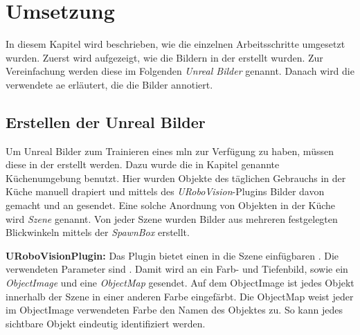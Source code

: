 \graphicspath{{./images/}}      
\def\CHAPTERONE{./chapters/Chapter-1} 

\chapter{Umsetzung}
\label{chap:implementation}
%	

In diesem Kapitel wird beschrieben, wie die einzelnen Arbeitsschritte umgesetzt wurden. Zuerst wird aufgezeigt, wie die Bildern in der \unreal erstellt wurden. Zur Vereinfachung werden diese  im Folgenden \textit{Unreal Bilder} genannt. Danach wird die verwendete \gls{ae} erläutert, die die Bilder annotiert. 

\section{Erstellen der Unreal Bilder}
\label{sec:takingpics}
Um Unreal Bilder zum Trainieren eines \gls{mln} zur Verfügung zu haben, müssen diese in der \unreal erstellt werden. Dazu wurde die in Kapitel  genannte Küchenumgebung benutzt. Hier wurden Objekte des täglichen Gebrauchs in der Küche manuell drapiert und mittels des \textit{URoboVision}-Plugins Bilder davon gemacht und an \robosherlock gesendet. Eine solche Anordnung von Objekten in der Küche wird \textit{Szene} genannt. Von jeder Szene wurden Bilder aus mehreren festgelegten Blickwinkeln mittels der \textit{SpawnBox} erstellt. \par 

\textbf{URoboVisionPlugin:} Das Plugin bietet einen in die Szene einfügbaren . Die verwendeten Parameter sind . Damit wird an \robosherlock ein Farb- und Tiefenbild, sowie ein \textit{ObjectImage} und eine \textit{ObjectMap} gesendet. Auf dem ObjectImage ist jedes Objekt innerhalb der Szene in einer anderen Farbe eingefärbt. Die ObjectMap weist jeder im ObjectImage verwendeten Farbe den Namen des Objektes zu. So kann jedes sichtbare Objekt eindeutig identifiziert werden.   \par 

